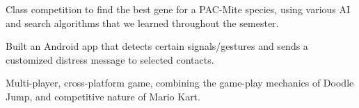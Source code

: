 \documentclass[letterpaper]{deedy-resume} %
\begin{document}
\begin{minipage}[t]{0.66\textwidth}
Class competition to find the best gene for a PAC-Mite species, using various AI and search algorithms that we learned throughout the semester.

\sectionspace %



Built an Android app that detects certain signals/gestures and sends a customized distress message to selected contacts.

\sectionspace %



Multi-player, cross-platform game, combining the game-play mechanics of Doodle Jump, and competitive nature of Mario Kart.

\sectionspace %


\end{minipage} %








\end{document}
